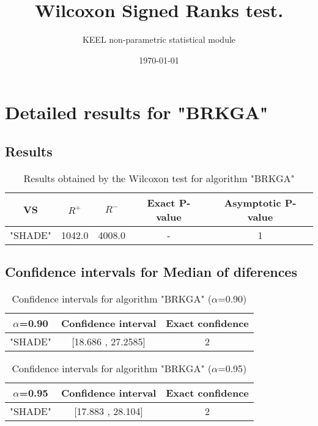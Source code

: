 \documentclass[a4paper,10pt]{article}
\title{Wilcoxon Signed Ranks test.}
\date{\today}
\author{KEEL non-parametric statistical module}
\begin{document}
\pagestyle{empty}
\maketitle
\thispagestyle{empty}



\section{Detailed results for "BRKGA"}


\subsection{Results}

\begin{table}[!htp]
\centering\small
\begin{tabular}{
|c|c|c|c|c|}
\hline
 VS & $R^{+}$ & $R^{-}$ & Exact P-value & Asymptotic P-value \\ \hline 
"SHADE" & 1042.0 & 4008.0 & - & 1\\ \hline 

\end{tabular}
\caption{Results obtained by the Wilcoxon test for algorithm "BRKGA"}
\end{table}

\subsection{Confidence intervals for Median of diferences}

\begin{table}[!htp]
\centering\small
\begin{tabular}{
|c|c|c|}
\hline
 $\alpha$=0.90 & Confidence interval & Exact confidence \\ \hline 
"SHADE" & [18.686 , 27.2585] & 2\\ \hline 

\end{tabular}
\caption{Confidence intervals for algorithm "BRKGA" ($\alpha$=0.90)}
\end{table}
\begin{table}[!htp]
\centering\small
\begin{tabular}{
|c|c|c|}
\hline
 $\alpha$=0.95 & Confidence interval & Exact confidence \\ \hline 
"SHADE" & [17.883 , 28.104] & 2\\ \hline 

\end{tabular}
\caption{Confidence intervals for algorithm "BRKGA" ($\alpha$=0.95)}
\end{table}
\end{document}

